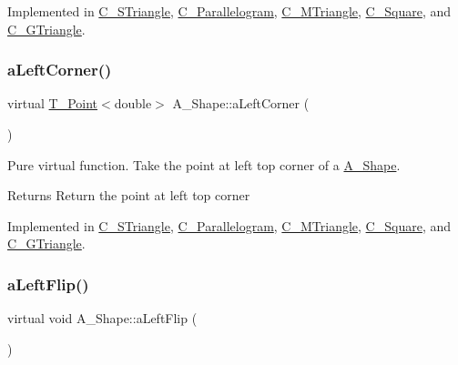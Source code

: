 Implemented in \hyperlink{classC__STriangle_a3bc82d7ea53a6a058b9fb49bbd89282c}{C\+\_\+\+S\+Triangle}, \hyperlink{classC__Parallelogram_a9ccee396c30606bfe64df416c22586d5}{C\+\_\+\+Parallelogram}, \hyperlink{classC__MTriangle_ae29e4f6608a0079507c6397b3dbef246}{C\+\_\+\+M\+Triangle}, \hyperlink{classC__Square_ac5ffad4afca051f117b43012fb4dc239}{C\+\_\+\+Square}, and \hyperlink{classC__GTriangle_a417b28c74dd35f81a19b5bd1d214ba8d}{C\+\_\+\+G\+Triangle}.

\mbox{\label{classA__Shape_abe6781b13037bf7ecea8ff9456b31533}} 
\subsubsection{\texorpdfstring{a\+Left\+Corner()}{aLeftCorner()}}
{\footnotesize\ttfamily virtual \hyperlink{classT__Point}{T\+\_\+\+Point}$<$double$>$ A\+\_\+\+Shape\+::a\+Left\+Corner (\begin{DoxyParamCaption}{ }\end{DoxyParamCaption})\hspace{0.3cm}{\ttfamily [pure virtual]}}



Pure virtual function. Take the point at left top corner of a \hyperlink{classA__Shape}{A\+\_\+\+Shape}. 

\begin{DoxyReturn}{Returns}
Return the point at left top corner 
\end{DoxyReturn}


Implemented in \hyperlink{classC__STriangle_a8e580f80693ea6f66cca3782ced8e301}{C\+\_\+\+S\+Triangle}, \hyperlink{classC__Parallelogram_a260c557810c63dd97f2dd64bc15b9dc8}{C\+\_\+\+Parallelogram}, \hyperlink{classC__MTriangle_ad077fce026711bf0a25fc4c1cb83ecb9}{C\+\_\+\+M\+Triangle}, \hyperlink{classC__Square_a13e97bb379f1678636e3baf781c2a01b}{C\+\_\+\+Square}, and \hyperlink{classC__GTriangle_a57943afaad0f6b7c3c13aa35a233e93b}{C\+\_\+\+G\+Triangle}.

\mbox{\label{classA__Shape_abe947e7003cb63be2b4f6c439533427d}} 
\subsubsection{\texorpdfstring{a\+Left\+Flip()}{aLeftFlip()}}
{\footnotesize\ttfamily virtual void A\+\_\+\+Shape\+::a\+Left\+Flip (\begin{DoxyParamCaption}{ }\end{DoxyParamCaption})\hspace{0.3cm}{\ttfamily [pure virtual]}}



